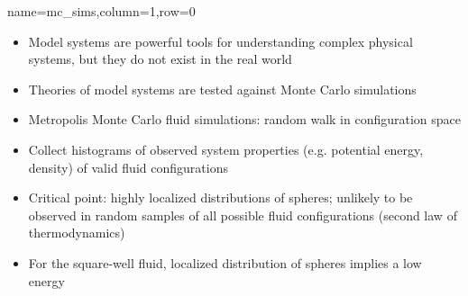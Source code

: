 \documentclass[paperwidth=48in,paperheight=36in,
fontscale=0.27,margin=0.75in]{baposter}
\begin{document}
\begin{poster}
{  }

  {name=mc_sims,column=1,row=0}{%





    \begin{itemize}
    \item Model systems are powerful tools for understanding complex
      physical systems, but they do not exist in the real world
    \item Theories of model systems are tested against Monte Carlo
      simulations
    \item Metropolis Monte Carlo fluid simulations: random walk in
      configuration space
    \item Collect histograms of observed system properties
      (e.g. potential energy, density) of valid fluid configurations
    \item Critical point: highly localized distributions of spheres;
      unlikely to be observed in random samples of all possible fluid
      configurations (second law of thermodynamics)
    \item For the square-well fluid, localized distribution of spheres
      implies a low energy
    \end{itemize}

}
\end{poster}
\end{document}
